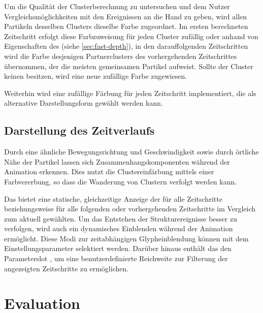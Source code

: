 Um die Qualität der Clusterberechnung zu untersuchen und dem Nutzer Vergleichsmöglichkeiten mit den Ereignissen an die Hand zu geben, wird allen Partikeln desselben Clusters dieselbe Farbe zugeordnet. Im ersten berechneten Zeitschritt erfolgt diese Farbzuweisung für jeden Cluster zufällig oder anhand von Eigenschaften des  (siehe \autoref{sec:fast-depth}), in den darauffolgenden Zeitschritten wird die Farbe desjenigen Partnerclusters des vorhergehenden Zeitschrittes übernommen, der die meisten gemeinsamen Partikel aufweist. Sollte der Cluster keinen  besitzen, wird eine neue zufällige Farbe zugewiesen.

Weiterhin wird eine zufällige Färbung für jeden Zeitschritt implementiert, die als alternative Darstellungsform gewählt werden kann.

\section{Darstellung des Zeitverlaufs}\label{sec:vis:zeitverlauf}
Durch eine ähnliche Bewegungsrichtung und Geschwindigkeit sowie durch örtliche Nähe der Partikel lassen sich Zusammenhangskomponenten während der Animation erkennen. Dies nutzt die Clustereinfärbung mittels einer Farbvererbung, so dass die Wanderung von Clustern verfolgt werden kann.

Das  bietet eine statische, gleichzeitige Anzeige der  für alle Zeitschritte beziehungsweise für alle folgenden oder vorhergehenden Zeitschritte im Vergleich zum aktuell gewählten. Um das Entstehen der Strukturereignisse besser zu verfolgen, wird auch ein dynamisches Einblenden während der Animation ermöglicht. Diese Modi zur zeitabhängigen Glypheinblendung können mit dem Einstellungsparameter  selektiert werden.
Darüber hinaus enthält das  den Parameterslot , um eine benutzerdefinierte Reichweite zur Filterung der angezeigten Zeitschritte zu ermöglichen.





\chapter{Evaluation}


